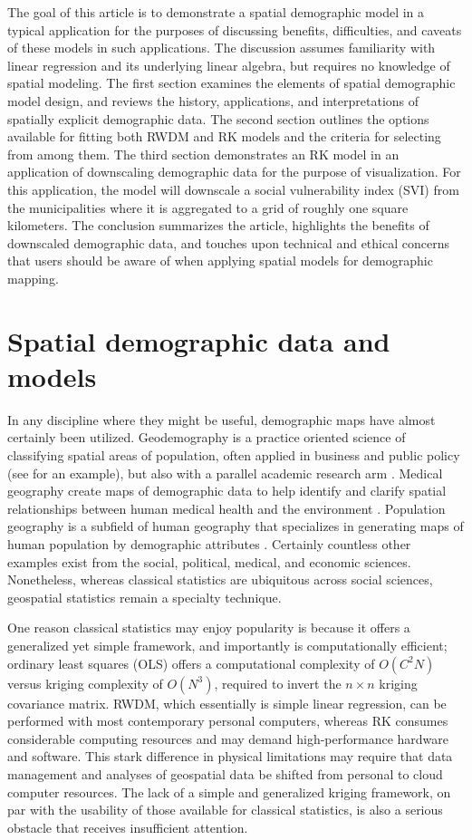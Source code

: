 \documentclass[draft]{article}
\begin{document}
The goal of this article is to demonstrate a spatial demographic model in a typical application for the purposes of discussing benefits, difficulties, and caveats of these models in such applications.  The discussion assumes familiarity with linear regression and its underlying linear algebra, but requires no knowledge of spatial modeling.  The first section examines the elements of spatial demographic model design, and reviews the history, applications, and interpretations of spatially explicit demographic data.  The second section outlines the options available for fitting both RWDM and RK models and the criteria for selecting from among them.  The third section demonstrates an RK model in an application of downscaling demographic data for the purpose of visualization.  For this application, the model will downscale a social vulnerability index (SVI) from the municipalities where it is aggregated to a grid of roughly one square kilometers.  The conclusion summarizes the article, highlights the benefits of downscaled demographic data, and touches upon technical and ethical concerns that users should be aware of when applying spatial models for demographic mapping.


\section{Spatial demographic data and models}

In any discipline where they might be useful, demographic maps have almost certainly been utilized.  Geodemography is a practice oriented science of classifying spatial areas of population, often applied in business and public policy (see \cite{acorn} for an example), but also with a parallel academic research arm \cite{oacug, pwnation, singleton14}.  Medical geography create maps of demographic data to help identify and clarify spatial relationships between human medical health and the environment \cite{brown09}.  Population geography is a subfield of human geography that specializes in generating maps of human population by demographic attributes \cite{bailey05}.  Certainly countless other examples exist from the social, political, medical, and economic sciences.  Nonetheless, whereas classical statistics are ubiquitous across social sciences, geospatial statistics remain a specialty technique.

One reason classical statistics may enjoy popularity is because it offers a generalized yet simple framework, and importantly is computationally efficient; ordinary least squares (OLS) offers a computational complexity of $O(C^2N)$ versus kriging complexity of $O(N^3)$, required to invert the $n \times n$ kriging covariance matrix.  RWDM, which essentially is simple linear regression, can be performed with most contemporary personal computers, whereas RK consumes considerable computing resources and may demand high-performance hardware and software.  This stark difference in physical limitations may require that data management and analyses of geospatial data be shifted from personal to cloud computer resources.  The lack of a simple and generalized kriging framework, on par with the usability of those available for classical statistics, is also a serious obstacle that receives insufficient attention.
\end{document}
